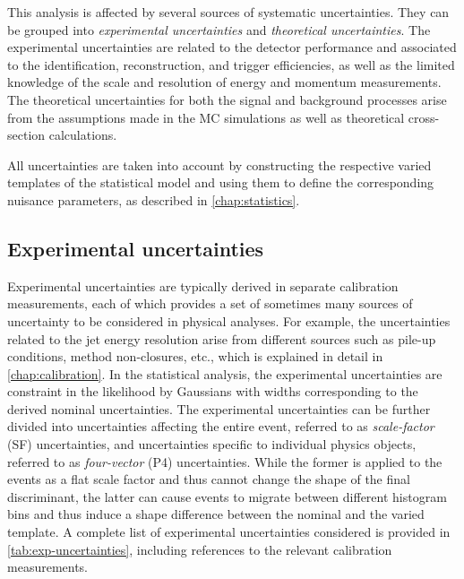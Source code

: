 This analysis is affected by several sources of systematic uncertainties.
They can be grouped into \emph{experimental uncertainties} and \emph{theoretical uncertainties}.
The experimental uncertainties are related to the detector performance and associated to the identification, reconstruction, and trigger efficiencies, as well as the limited knowledge of the scale and resolution of energy and momentum measurements.
The theoretical uncertainties for both the signal and background processes arise from the assumptions made in the MC simulations as well as theoretical cross-section calculations. 

All uncertainties are taken into account by constructing the respective varied templates of the statistical model and using them to define the corresponding nuisance parameters, as described in \cref{chap:statistics}.

\subsection{Experimental uncertainties}
Experimental uncertainties are typically derived in separate calibration measurements, each of which provides a set of sometimes many sources of uncertainty to be considered in physical analyses.
For example, the uncertainties related to the jet energy resolution arise from different sources such as pile-up conditions, method non-closures, etc., which is explained in detail in \cref{chap:calibration}.
In the statistical analysis, the experimental uncertainties are constraint in the likelihood by Gaussians with widths corresponding to the derived nominal uncertainties.
The experimental uncertainties can be further divided into uncertainties affecting the entire event, referred to as \emph{scale-factor} (SF) uncertainties, and uncertainties specific to individual physics objects, referred to as \emph{four-vector} (P4) uncertainties.
While the former is applied to the events as a flat scale factor and thus cannot change the shape of the final discriminant, the latter can cause events to migrate between different histogram bins and thus induce a shape difference between the nominal and the varied template.
A complete list of experimental uncertainties considered is provided in \cref{tab:exp-uncertainties}, including references to the relevant calibration measurements. 

